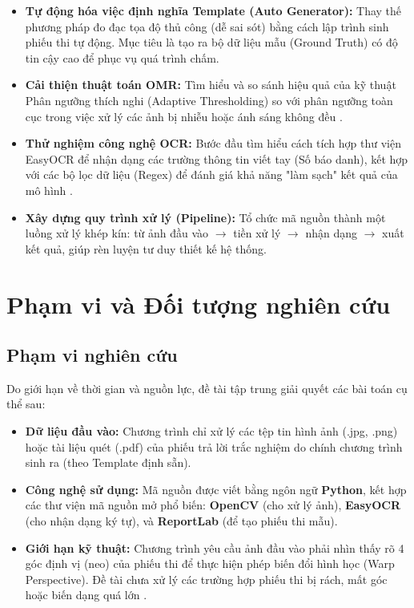 \documentclass[6pt, a4paper]{report}
\begin{document}
	\begin{itemize}
		\item \textbf{Tự động hóa việc định nghĩa Template (Auto Generator):} Thay thế phương pháp đo đạc tọa độ thủ công (dễ sai sót) bằng cách lập trình sinh phiếu thi tự động. Mục tiêu là tạo ra bộ dữ liệu mẫu (Ground Truth) có độ tin cậy cao để phục vụ quá trình chấm.
		\item \textbf{Cải thiện thuật toán OMR:} Tìm hiểu và so sánh hiệu quả của kỹ thuật Phân ngưỡng thích nghi (Adaptive Thresholding) so với phân ngưỡng toàn cục trong việc xử lý các ảnh bị nhiễu hoặc ánh sáng không đều \cite{ref_omr}.
		\item \textbf{Thử nghiệm công nghệ OCR:} Bước đầu tìm hiểu cách tích hợp thư viện EasyOCR để nhận dạng các trường thông tin viết tay (Số báo danh), kết hợp với các bộ lọc dữ liệu (Regex) để đánh giá khả năng "làm sạch" kết quả của mô hình \cite{ref_ocr}.
		\item \textbf{Xây dựng quy trình xử lý (Pipeline):} Tổ chức mã nguồn thành một luồng xử lý khép kín: từ ảnh đầu vào $\rightarrow$ tiền xử lý $\rightarrow$ nhận dạng $\rightarrow$ xuất kết quả, giúp rèn luyện tư duy thiết kế hệ thống.
	\end{itemize}
	
	\section{Phạm vi và Đối tượng nghiên cứu}
	
	\subsection{Phạm vi nghiên cứu}
	Do giới hạn về thời gian và nguồn lực, đề tài tập trung giải quyết các bài toán cụ thể sau:
	\begin{itemize}
		\item \textbf{Dữ liệu đầu vào:} Chương trình chỉ xử lý các tệp tin hình ảnh (.jpg, .png) hoặc tài liệu quét (.pdf) của phiếu trả lời trắc nghiệm do chính chương trình sinh ra (theo Template định sẵn).
		\item \textbf{Công nghệ sử dụng:} Mã nguồn được viết bằng ngôn ngữ \textbf{Python}, kết hợp các thư viện mã nguồn mở phổ biến: \textbf{OpenCV} (cho xử lý ảnh), \textbf{EasyOCR} (cho nhận dạng ký tự), và \textbf{ReportLab} (để tạo phiếu thi mẫu).
		\item \textbf{Giới hạn kỹ thuật:} Chương trình yêu cầu ảnh đầu vào phải nhìn thấy rõ 4 góc định vị (neo) của phiếu thi để thực hiện phép biến đổi hình học (Warp Perspective). Đề tài chưa xử lý các trường hợp phiếu thi bị rách, mất góc hoặc biến dạng quá lớn \cite{ref_limits}.
	\end{itemize}
	
\end{document}
